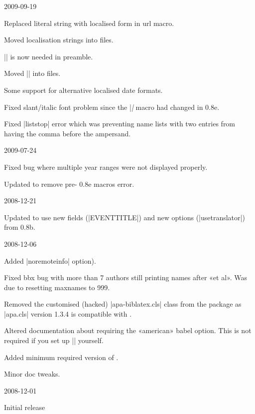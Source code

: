 \documentclass{ltxdockit}
\begin{document}
\begin{changelog}
\begin{release}{0.5}{2009-09-19}
\item Replaced literal string with localised form in url macro.
\item Moved localisation strings into  files.
\item |\DeclareLanguageMapping| is now needed in preamble.
\item Moved |\DeclareBibliographyExtras| into  files.
\item Some support for alternative localised date formats.
\item Fixed slant/italic font problem since the |\mkbibemph| macro had
  changed in  0.8e.
\item Fixed |liststop| error which was preventing name lists with two
  entries from having the comma before the ampersand.
\end{release}

\begin{release}{0.4}{2009-07-24}
\item Fixed bug where multiple year ranges were not displayed properly.
\item Updated to remove pre- 0.8e macros error.
\end{release}

\begin{release}{0.3}{2008-12-21}
\item Updated to use new fields (|EVENTTITLE|) and new options
  (|usetranslator|) from  0.8b.
\end{release}

\begin{release}{0.2}{2008-12-06}
\item Added |noremoteinfo| option).
\item Fixed bbx bug with more than 7 authors still printing names after «et al». Was
  due to resetting maxnames to 999.
\item Removed the customised (hacked) |apa-biblatex.cls| class from the package as
  |apa.cls| version 1.3.4 is compatible with .
\item Altered documentation about requiring the «american» babel option.
  This is not required if you set up |\DeclareQuotePunctuation| yourself.
\item Added minimum required version of .
\item Minor doc tweaks.
\end{release}

\begin{release}{0.1}{2008-12-01}
\item Initial release
\end{release}



\end{changelog}
\end{document}
